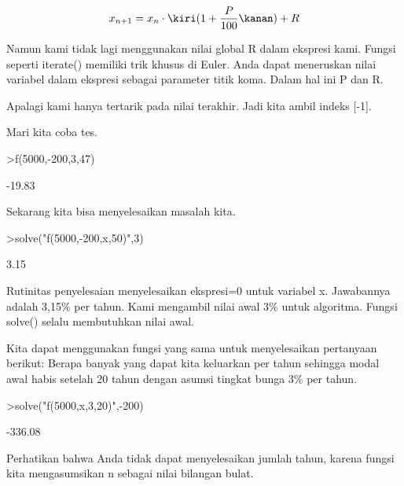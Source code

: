 \documentclass[a4paper,10pt]{article}
\begin{document}
\begin{eulernotebook}
\begin{eulercomment}
\begin{eulercomment}
\begin{eulercomment}
\begin{eulercomment}
\begin{eulercomment}
\begin{eulercomment}
\begin{eulercomment}
\begin{eulercomment}
\begin{eulercomment}
\end{eulercomment}
\begin{eulerformula}
\[
x_{n+1} = x_n \cdot \kiri(1+ \frac{P}{100}\kanan) + R
\]
\end{eulerformula}
\begin{eulercomment}
Namun kami tidak lagi menggunakan nilai global R dalam ekspresi kami.
Fungsi seperti iterate() memiliki trik khusus di Euler. Anda dapat
meneruskan nilai variabel dalam ekspresi sebagai parameter titik koma.
Dalam hal ini P dan R.

Apalagi kami hanya tertarik pada nilai terakhir. Jadi kita ambil
indeks [-1].

Mari kita coba tes.
\end{eulercomment}
\begin{eulerprompt}
>f(5000,-200,3,47)
\end{eulerprompt}
\begin{euleroutput}
       -19.83 
\end{euleroutput}
\begin{eulercomment}
Sekarang kita bisa menyelesaikan masalah kita.
\end{eulercomment}
\begin{eulerprompt}
>solve("f(5000,-200,x,50)",3)
\end{eulerprompt}
\begin{euleroutput}
         3.15 
\end{euleroutput}
\begin{eulercomment}
Rutinitas penyelesaian menyelesaikan ekspresi=0 untuk variabel x.
Jawabannya adalah 3,15\% per tahun. Kami mengambil nilai awal 3\% untuk
algoritma. Fungsi solve() selalu membutuhkan nilai awal.

Kita dapat menggunakan fungsi yang sama untuk menyelesaikan pertanyaan
berikut: Berapa banyak yang dapat kita keluarkan per tahun sehingga
modal awal habis setelah 20 tahun dengan asumsi tingkat bunga 3\% per
tahun.
\end{eulercomment}
\begin{eulerprompt}
>solve("f(5000,x,3,20)",-200)
\end{eulerprompt}
\begin{euleroutput}
      -336.08 
\end{euleroutput}
\begin{eulercomment}
Perhatikan bahwa Anda tidak dapat menyelesaikan jumlah tahun, karena
fungsi kita mengasumsikan n sebagai nilai bilangan bulat.


\end{eulercomment}
\end{eulercomment}
\end{eulercomment}
\end{eulercomment}
\end{eulercomment}
\end{eulercomment}
\end{eulercomment}
\end{eulercomment}
\end{eulercomment}
\end{eulernotebook}
\end{document}
